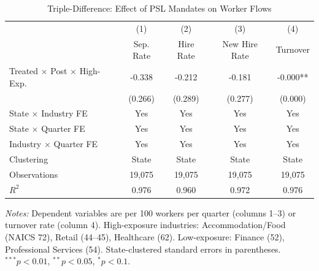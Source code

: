 \begin{table}[htbp]
\centering
\caption{Triple-Difference: Effect of PSL Mandates on Worker Flows}
\label{tab:ddd}
\begin{tabular}{lcccc}
\hline\hline
 & (1) & (2) & (3) & (4) \\
 & Sep. Rate & Hire Rate & New Hire Rate & Turnover \\
\hline
Treated $\times$ Post $\times$ High-Exp. & -0.338 & -0.212 & -0.181 & -0.000** \\
 & (0.266) & (0.289) & (0.277) & (0.000) \\[6pt]
State $\times$ Industry FE & Yes & Yes & Yes & Yes \\
State $\times$ Quarter FE & Yes & Yes & Yes & Yes \\
Industry $\times$ Quarter FE & Yes & Yes & Yes & Yes \\
Clustering & State & State & State & State \\
Observations & 19,075 & 19,075 & 19,075 & 19,075 \\
$R^2$ & 0.976 & 0.960 & 0.972 & 0.976 \\
\hline\hline
\end{tabular}
\begin{tablenotes}[flushleft]
\small
\item \textit{Notes:} Dependent variables are per 100 workers per quarter (columns 1--3) or turnover rate (column 4). High-exposure industries: Accommodation/Food (NAICS 72), Retail (44--45), Healthcare (62). Low-exposure: Finance (52), Professional Services (54). State-clustered standard errors in parentheses. $^{***}p<0.01$, $^{**}p<0.05$, $^{*}p<0.1$.
\end{tablenotes}
\end{table}
